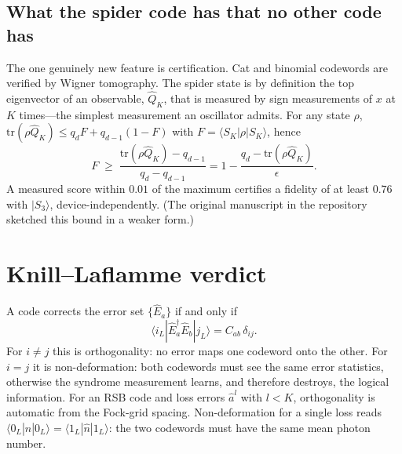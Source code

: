 \documentclass[aps,pra,reprint,superscriptaddress,amsmath,amssymb,nofootinbib]{revtex4-2}
\newcommand{\ket}[1]{|#1\rangle}
\newcommand{\bra}[1]{\langle#1|}
\newcommand{\n}{\hat n}
\begin{document}
\subsection{What the spider code has that no other code has}
The one genuinely new feature is certification. Cat and binomial codewords are
verified by Wigner tomography. The spider state is by definition the top
eigenvector of an observable, $\hat Q_K$, that is measured by sign
measurements of $x$ at $K$ times---the simplest measurement an oscillator
admits. For any state $\rho$,
$\mathrm{tr}(\rho\hat Q_K)\le q_dF+q_{d-1}(1-F)$ with
$F=\bra{S_K}\rho\ket{S_K}$, hence
\begin{equation}
  F\;\ge\;\frac{\mathrm{tr}(\rho\hat Q_K)-q_{d-1}}{q_d-q_{d-1}}
  =1-\frac{q_d-\mathrm{tr}(\rho\hat Q_K)}{\epsilon}.
  \label{eq:witness}
\end{equation}
A measured score within $0.01$ of the maximum certifies a fidelity of at least
$0.76$ with $\ket{S_3}$, device-independently. (The original manuscript in the
repository sketched this bound in a weaker form.)

\section{Knill--Laflamme verdict}\label{sec:kl}
A code corrects the error set $\{\hat E_a\}$ if and only if
\cite{knill1997,nielsenchuang}
\begin{equation}
  \bra{i_L}\hat E_a^\dagger\hat E_b\ket{j_L}=C_{ab}\,\delta_{ij}. \label{eq:kl}
\end{equation}
For $i\ne j$ this is orthogonality: no error maps one codeword onto the other.
For $i=j$ it is non-deformation: both codewords must see the same error
statistics, otherwise the syndrome measurement learns, and therefore destroys,
the logical information. For an RSB code and loss errors $\hat a^l$ with
$l<K$, orthogonality is automatic from the Fock-grid spacing. Non-deformation
for a single loss reads $\bra{0_L}\n\ket{0_L}=\bra{1_L}\n\ket{1_L}$: the two
codewords must have the same mean photon number.
\end{document}

